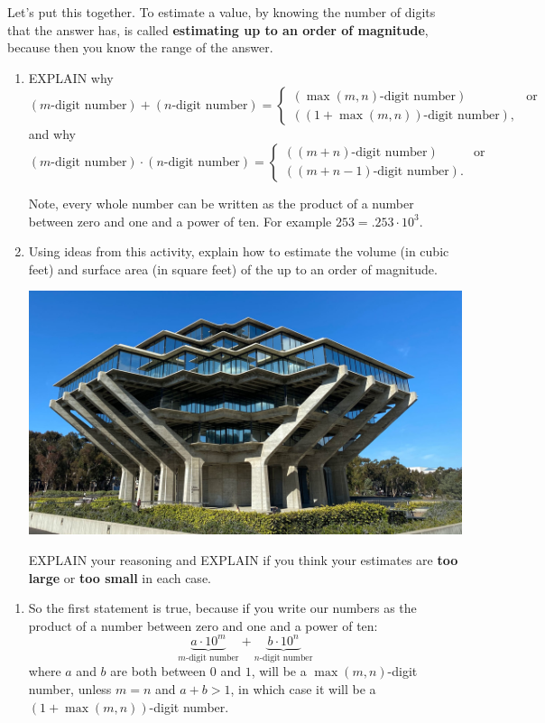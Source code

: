 \documentclass[nooutcomes,noauthor,handout,hints]{ximera}
\begin{document}
\begin{question}
  Let's put this together. To estimate a value, by knowing the number
  of digits that the answer has, is called \textbf{estimating up to an
    order of magnitude}, because then you know the range of the
  answer.
  \begin{enumerate}
  \item EXPLAIN why 
    \[
    (\text{$m$-digit number}) + (\text{$n$-digit number}) =
    \begin{cases}
      (\text{$\max(m,n)$-digit number}) & \text{or}\\
      (\text{$(1+\max(m,n))$-digit number}),
    \end{cases}
    \]
    and why
    \[
    (\text{$m$-digit number}) \cdot (\text{$n$-digit number}) = \begin{cases}
      (\text{$(m+n)$-digit number}) & \text{or}\\
      (\text{$(m+n-1)$-digit number}).
    \end{cases}
    \]
    \begin{hint}
    Note, every whole number can be written as the product of a number
    between zero and one and a power of ten. For example $253 = .253\cdot 10^3$.
  \end{hint}
  \item Using ideas from this activity, explain how to estimate the
    volume (in cubic feet) and surface area (in square feet) of the  up to an
    order of magnitude.

  \begin{center}
    \includegraphics[width=.4\textwidth]{geisel.jpg} 
  \end{center}

    EXPLAIN your reasoning and EXPLAIN if you
    think your estimates are \textbf{too large} or \textbf{too small}
    in each case.
  \end{enumerate}
  
  \begin{freeResponse}
    \begin{enumerate}
    \item So the first statement is true, because if you write our
      numbers as the product of a number between zero and one
      and a power of ten:
      \[
      \underbrace{a\cdot 10^m}_{\text{$m$-digit number}} + \underbrace{b\cdot 10^n}_{\text{$n$-digit number}}
      \]
      where $a$ and $b$ are both between $0$ and $1$, will be a
      $\max(m,n)$-digit number, unless $m=n$ and $a+b>1$, in which case it will be a $(1+\max(m,n))$-digit number.


\end{enumerate}
\end{freeResponse}
\end{question}
\end{document}
